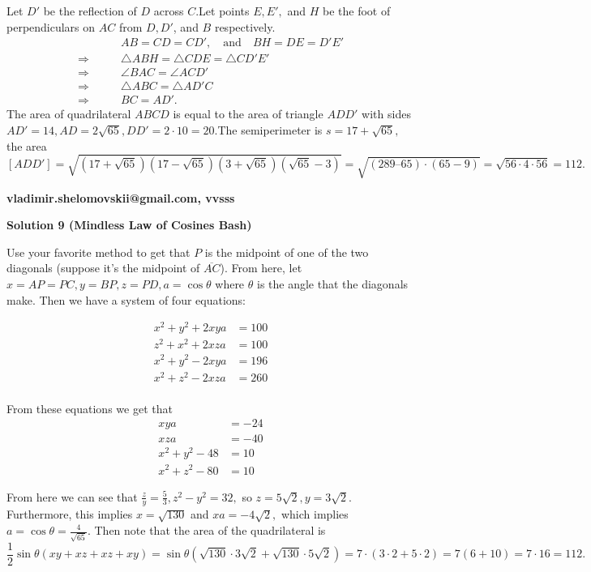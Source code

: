 \begin{enumerate}
 Let $D'$ be the reflection of $D$ across $C$.Let points $E, E',$ and $H$ be the foot of perpendiculars on $AC$ from $D,D'$, and $B$ respectively.
 \begin{align*} &\qquad AB = CD = CD', \quad \textrm{and} \quad BH = DE = D'E' \\ \Rightarrow &\qquad \triangle ABH =  \triangle CDE =  \triangle CD'E' \\ \Rightarrow &\qquad \angle BAC = \angle ACD' \\ \Rightarrow &\qquad \triangle ABC =  \triangle AD'C \\ \Rightarrow &\qquad BC = AD'. \end{align*}
The area of quadrilateral $ABCD$ is equal to the area of triangle $ADD'$ with sides $AD' = 14, AD = 2\sqrt{65}, DD' = 2 \cdot 10 = 20$.The semiperimeter is $s = 17 + \sqrt{65},$ the area 
 \[[ADD'] = \sqrt {(17 + \sqrt{65}) (17 - \sqrt{65})(3 + \sqrt{65})(\sqrt{65}-3)} = \sqrt{(289 – 65)\cdot(65-9)} =\sqrt{56 \cdot 4 \cdot 56} = \boxed{112}.\]

 \textbf{vladimir.shelomovskii@gmail.com, vvsss}

 



\textbf{Solution 9 (Mindless Law of Cosines Bash)}

Use your favorite method to get that $P$ is the midpoint of one of the two diagonals (suppose it's the midpoint of $\overline{AC}$). From here, let $x=AP=PC, y=BP, z=PD, a=\cos\theta$ where $\theta$ is the angle that the diagonals make. Then we have a system of four equations:

 
 \begin{align*} x^2+y^2+2xya &= 100 \\ z^2+x^2+2xza &= 100 \\ x^2+y^2-2xya &= 196 \\ x^2+z^2-2xza &= 260 \\ \end{align*}


 From these equations we get that 
 \begin{align*} xya &= -24 \\ xza &= -40 \\ x^2+y^2-48 &= 10 \\ x^2+z^2-80 &= 10 \end{align*}


 From here we can see that $\frac{z}{y}=\frac{5}{3}, z^2-y^2=32,$ so $z=5\sqrt{2}, y=3\sqrt{2}.$ Furthermore, this implies $x=\sqrt{130}$ and $xa=-4\sqrt{2},$ which implies $a=\cos\theta=\frac{4}{\sqrt{65}}.$ Then note that the area of the quadrilateral is 
 \[\frac{1}{2}\sin\theta (xy+xz+xz+xy)=\sin\theta (\sqrt{130}\cdot 3\sqrt{2}+\sqrt{130} \cdot 5\sqrt{2})=7\cdot (3\cdot 2+5\cdot 2)=7(6+10)=7\cdot 16=\boxed{112}.\]





\end{enumerate}
